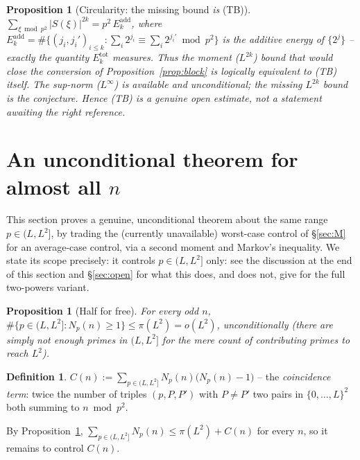 \documentclass[11pt]{article}
\theoremstyle{plain}
\newtheorem{proposition}[theorem]{Proposition}
\theoremstyle{definition}
\newtheorem{definition}[theorem]{Definition}
\theoremstyle{remark}
\begin{document}
\begin{proposition}[Circularity: the missing bound \emph{is} (TB)]\label{prop:circ}
$\sum_{\xi\bmod p^2}|S(\xi)|^{2k}=p^2\,E_k^{\mathrm{add}}$, where
$E_k^{\mathrm{add}}=\#\{(j_i,j_i')_{i\le k}:\sum_i2^{j_i}\equiv\sum_i2^{j_i'}\bmod p^2\}$
is the additive energy of $\{2^j\}$ -- exactly the quantity $E_k^{\mathrm{tot}}$
measures. Thus the moment ($L^{2k}$) bound that would close the conversion of
Proposition~\ref{prop:block} is logically equivalent to (TB) itself. The
sup-norm ($L^\infty$) is available and unconditional; the missing $L^{2k}$ bound
is the conjecture. Hence (TB) is a genuine open estimate, not a statement awaiting
the right reference.
\end{proposition}

\section{An unconditional theorem for almost all $n$}\label{sec:almost}

This section proves a genuine, unconditional theorem about the same range
$p\in(L,L^2]$, by trading the (currently unavailable) worst-case control of
\S\ref{sec:M} for an average-case control, via a second moment and Markov's
inequality. We state its scope precisely: it controls $p\in(L,L^2]$ only: see
the discussion at the end of this section and \S\ref{sec:open} for what this
does, and does not, give for the full two-powers variant.

\begin{proposition}[Half for free]\label{prop:Qfree}
For every odd $n$, $\#\{p\in(L,L^2]:N_p(n)\ge1\}\le\pi(L^2)=o(L^2)$,
unconditionally (there are simply not enough primes in $(L,L^2]$ for the
mere \emph{count} of contributing primes to reach $L^2$).
\end{proposition}

\begin{definition}
$\displaystyle C(n):=\sum_{p\in(L,L^2]}N_p(n)\bigl(N_p(n)-1\bigr)$ -- the
\emph{coincidence term}: twice the number of triples $(p,P,P')$ with
$P\ne P'$ two pairs in $\{0,\dots,L\}^2$ both summing to $n\bmod p^2$.
\end{definition}

By Proposition~\ref{prop:Qfree}, $\sum_{p\in(L,L^2]}N_p(n)\le\pi(L^2)+C(n)$
for every $n$, so it remains to control $C(n)$.
\end{document}
